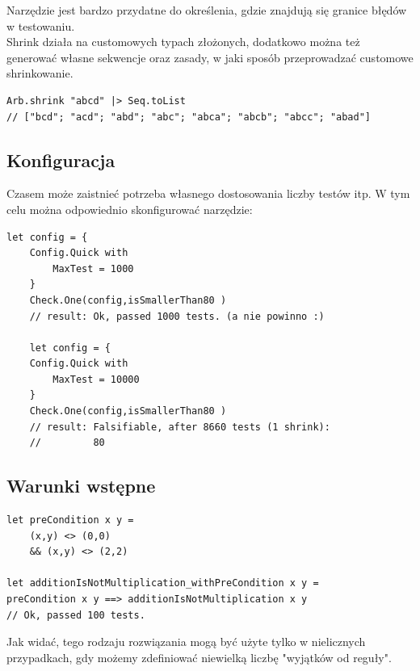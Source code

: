 Narzędzie jest bardzo przydatne do określenia, gdzie znajdują się granice błędów w testowaniu.\\
Shrink działa na customowych typach złożonych, dodatkowo można też generować własne sekwencje oraz zasady, w jaki sposób przeprowadzać customowe shrinkowanie. 

\lstset{language=FSharp, basicstyle=\scriptsize}
\begin{lstlisting}[frame=single,caption={Shrinkowanie ciągu znaków},label=kod:listingA]
Arb.shrink "abcd" |> Seq.toList
// ["bcd"; "acd"; "abd"; "abc"; "abca"; "abcb"; "abcc"; "abad"]
\end{lstlisting}

\subsection{Konfiguracja}
Czasem może zaistnieć potrzeba własnego dostosowania liczby testów itp. W tym celu można odpowiednio skonfigurować narzędzie:
\lstset{language=FSharp, basicstyle=\scriptsize}
\begin{lstlisting}[frame=single,caption={Dostosowanie konfiguracji testów},label=kod:listingA]
let config = {
    Config.Quick with
        MaxTest = 1000
    }
    Check.One(config,isSmallerThan80 )
    // result: Ok, passed 1000 tests. (a nie powinno :)
    
    let config = {
    Config.Quick with
        MaxTest = 10000
    }
    Check.One(config,isSmallerThan80 )
    // result: Falsifiable, after 8660 tests (1 shrink):
    //         80
\end{lstlisting}

\subsection{Warunki wstępne}
\lstset{language=FSharp, basicstyle=\scriptsize}
\begin{lstlisting}[frame=single,caption={Dodawanie warunków wstępnych},label=kod:listingA]
let preCondition x y =
    (x,y) <> (0,0)
    && (x,y) <> (2,2)

let additionIsNotMultiplication_withPreCondition x y =
preCondition x y ==> additionIsNotMultiplication x y
// Ok, passed 100 tests.
\end{lstlisting}

Jak widać, tego rodzaju rozwiązania mogą być użyte tylko w nielicznych przypadkach, gdy możemy zdefiniować niewielką liczbę "wyjątków od reguły".

